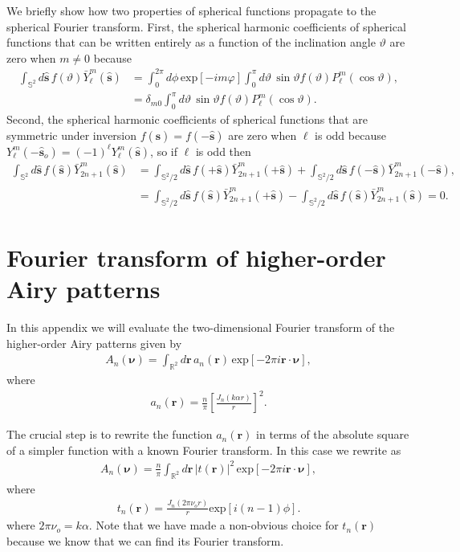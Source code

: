 \documentclass[]{osa-article}
\providecommand{\mb}[1]{\mathbf{#1}}
\providecommand{\so}{\mathbf{\hat{s}}_o}
\providecommand{\mh}[1]{\mathbf{\hat{#1}}}
\providecommand{\mbb}[1]{\mathbb{#1}}
\providecommand{\bs}[1]{\boldsymbol{#1}}
\providecommand{\bv}{\bs{\nu}}
\begin{document}
We briefly show how two properties of spherical functions propagate to the
spherical Fourier transform. First, the spherical harmonic coefficients of
spherical functions that can be written entirely as a function of the
inclination angle $\vartheta$ are zero when $m\neq0$ because
\begin{align}
  \int_{\mbb{S}^2}d\mh{s}\, f(\vartheta)\bar{Y}_\ell^m(\mh{s}) &= \int_0^{2\pi}d\phi\, \text{exp}[-im\varphi]\int_0^{\pi}d\vartheta\, \sin\vartheta f(\vartheta)P_\ell^m(\cos\vartheta),\\ &= \delta_{m0}\int_0^{\pi}d\vartheta\, \sin\vartheta f(\vartheta)P_\ell^m(\cos\vartheta).
\end{align}
Second, the spherical harmonic coefficients of spherical functions that are
symmetric under inversion $f(\mh{s}) = f(-\mh{s})$ are zero when $\ell$ is odd
because $Y_\ell^m(-\so) = (-1)^\ell Y_\ell^m(\mh{s})$, so if $\ell$ is odd then
\begin{align}
  \int_{\mbb{S}^2}d\mh{s}\, f(\mh{s})\bar{Y}_{2n+1}^m(\mh{s}) &= \int_{\mbb{S}^2/2}d\mh{s}\, f(+\mh{s})\bar{Y}_{2n+1}^m(+\mh{s}) + \int_{\mbb{S}^2/2}d\mh{s}\, f(-\mh{s})\bar{Y}_{2n+1}^m(-\mh{s}),\\
&=\int_{\mbb{S}^2/2}d\mh{s}\, f(\mh{s})\bar{Y}_{2n+1}^m(+\mh{s}) - \int_{\mbb{S}^2/2}d\mh{s}\, f(\mh{s})\bar{Y}_{2n+1}^m(\mh{s}) = 0.                                                                
\end{align}
\section{Fourier transform of higher-order Airy patterns} \label{sec:airy}
In this appendix we will evaluate the two-dimensional Fourier transform of the
higher-order Airy patterns given by
\begin{align}
  A_n(\bv) = \int_{\mbb{R}^2}d\mb{r}\, a_n(\mb{r})\, \text{exp}\left[-2\pi i\mb{r}\cdot\bv\right],  \label{eq:ftA}
\end{align}
where 
\begin{align}
    a_n(\mb{r}) =  \frac{n}{\pi}\left[\frac{J_n(k\alpha r)}{r}\right]^2.
\end{align}

The crucial step is to rewrite the function $a_n(\mb{r})$ in terms of the absolute
square of a simpler function with a known Fourier transform. In this case we
rewrite as
\begin{align}
  A_n(\bv) = \frac{n}{\pi}\int_{\mbb{R}^2}d\mb{r}\, |t(\mb{r})|^2\, \text{exp}\left[-2\pi i\mb{r}\cdot\bv\right],  \label{eq:ftA}
\end{align}
where 
\begin{align}
t_n(\mb{r}) = \frac{J_n(2\pi\nu_o r)}{r}\text{exp}[i(n-1)\phi].
\end{align}
where $2\pi\nu_o = k\alpha$. Note that we have made a non-obvious choice for
$t_n(\mb{r})$ because we know that we can find its Fourier transform.
\end{document}

